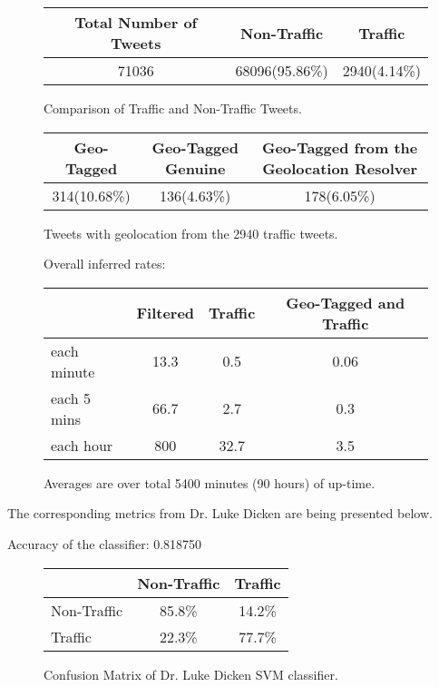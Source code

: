 \begin{figure}[h!]
\begin{center}
    \begin{tabular}{| c | c | c | }
    \hline
        Total Number of Tweets  & Non-Traffic & Traffic \\ \hline 
        71036 & 68096(95.86\%) & 2940(4.14\%) \\ \hline
    \end{tabular}
    \caption{Comparison of Traffic and Non-Traffic Tweets.}
    \label{fig:metrics1}
\end{center}
\end{figure}
	
\begin{figure}[h!]
\begin{center}
    \begin{tabular}{| c | c | c | }
    \hline
        Geo-Tagged  & Geo-Tagged Genuine & Geo-Tagged from the 
Geolocation Resolver \\ \hline 
        314(10.68\%) & 136(4.63\%) & 178(6.05\%) \\ \hline
    \end{tabular}
    \caption{Tweets with geolocation from the 2940 traffic tweets.}
    \label{fig:metrics2}
\end{center}
\end{figure}


\begin{figure}[h!]
Overall inferred rates:
\begin{center}
    \begin{tabular}{| l || c | c | c |}
    \hline
        & Filtered & Traffic & Geo-Tagged and Traffic\\ \hline \hline
        each minute & 13.3 & 0.5 & 0.06 \\ \hline
		each 5 mins & 66.7 &  2.7 & 0.3 \\ \hline
		each hour & 800 & 32.7 & 3.5 \\ \hline
    \end{tabular}
    \caption{Averages are over total 5400 minutes (90 hours) of up-time.}
    \label{fig:metrics3}
\end{center}
\end{figure}

The corresponding metrics from Dr. Luke Dicken are being presented below.

Accuracy of the classifier:   0.818750

\begin{figure}[h!]
\begin{center}
    \begin{tabular}{| l || c | c | }
    \hline
          & Non-Traffic & Traffic \\ \hline \hline
        Non-Traffic & 85.8\% & 14.2\% \\ \hline
        Traffic & 22.3\% & 77.7\% \\ \hline
    \end{tabular}
    \caption{Confusion Matrix of Dr. Luke Dicken SVM classifier.}
    \label{fig:confusionMatrixLuke}
\end{center}
\end{figure}

